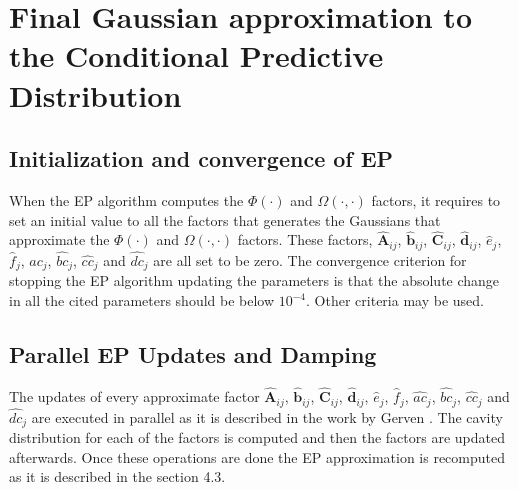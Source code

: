 \documentclass[review,preprint,12pt]{elsarticle}
\begin{document}
\section{Final Gaussian approximation to the Conditional Predictive Distribution}

\subsection{Initialization and convergence of EP}
When the EP algorithm computes the $\Phi(\cdot)$ and $\Omega(\cdot,\cdot)$ factors, it requires to set an initial value to all the factors that generates the Gaussians that approximate the $\Phi(\cdot)$ and $\Omega(\cdot,\cdot)$ factors. These factors, $\hat{\boldsymbol{A}}_{ij}$, $\hat{\boldsymbol{b}}_{ij}$, $\hat{\boldsymbol{C}}_{ij}$, $\hat{\boldsymbol{d}}_{ij}$, $\hat{e}_{j}$, $\hat{f}_{j}$, $\hat{ac}_j$, $\hat{bc}_j$, $\hat{cc}_j$ and $\hat{dc}_j$ are all set to be zero. The convergence criterion for stopping the EP algorithm updating the parameters is that the absolute change in all the cited parameters should be below $10^{-4}$. Other criteria may be used.

\subsection{Parallel EP Updates and Damping}

The updates of every approximate factor $\hat{\boldsymbol{A}}_{ij}$, $\hat{\boldsymbol{b}}_{ij}$, $\hat{\boldsymbol{C}}_{ij}$, $\hat{\boldsymbol{d}}_{ij}$, $\hat{e}_{j}$, $\hat{f}_{j}$, $\hat{ac}_j$, $\hat{bc}_j$, $\hat{cc}_j$ and $\hat{dc}_j$ are executed in parallel as it is described in the work by Gerven \citep{gerven2009bayesian}. The cavity distribution for each of the factors is computed and then the factors are updated afterwards. Once these operations are done the EP approximation is recomputed as it is described in the section 4.3.
\end{document}
